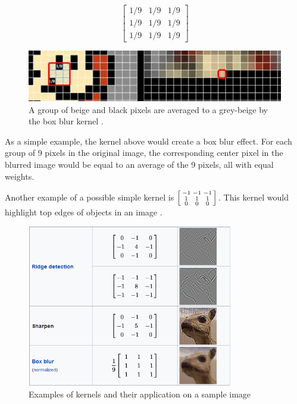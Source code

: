 \documentclass[12pt,a4paper,notitlepage]{article}
\begin{document}
\begin{displaymath}
	\begin{bmatrix}
		1/9 & 1/9 & 1/9 \\
		1/9 & 1/9 & 1/9 \\
		1/9 & 1/9 & 1/9
	\end{bmatrix}
\end{displaymath}

\begin{figure}[htbp]
	\centering
		\includegraphics[width=1.00\textwidth]{images/box-blur.jpg}
	\caption{A group of beige and black pixels are averaged to a grey-beige by the box blur kernel \cite{sanderson_convolutions_2020}.}
	\label{fig:box-blur}
\end{figure}

As a simple example, the kernel above would create a box blur effect. For each group of 9 pixels in the original image, the corresponding center pixel in the blurred image would be equal to an average of the 9 pixels, all with equal weights.

Another example of a possible simple kernel is \(\begin{bsmallmatrix}-1 & -1 & -1 \\ 1 & 1 & 1 \\ 0 & 0 & 0\end{bsmallmatrix}\). This kernel would highlight top edges of objects in an image \cite{deep_lizard_convolutional_2017}.

\begin{figure}[htbp]
	\centering
		\includegraphics[width=0.8\textwidth]{images/image-convolutions-examples.png}
	\caption{Examples of kernels and their application on a sample image \cite{wikipedia_collaborators_kernel_2022}}
	\label{fig:image-convolutions-examples}
\end{figure}
\end{document}
